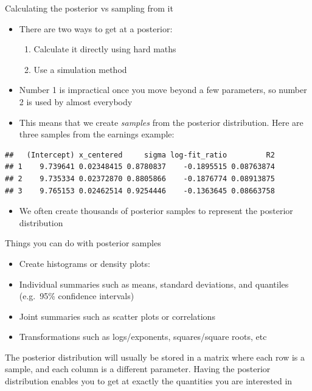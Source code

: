 \documentclass[ignorenonframetext,]{beamer}
\providecommand{\tightlist}{%
  \setlength{\itemsep}{0pt}\setlength{\parskip}{0pt}}
\begin{document}
\begin{frame}[fragile]{Calculating the posterior vs sampling from it}

\begin{itemize}
\item
  There are two ways to get at a posterior:

  \begin{enumerate}
  \def\labelenumi{\arabic{enumi}.}
  \tightlist
  \item
    Calculate it directly using hard maths
  \item
    Use a simulation method
  \end{enumerate}
\item
  Number 1 is impractical once you move beyond a few parameters, so
  number 2 is used by almost everybody
\item
  This means that we create \emph{samples} from the posterior
  distribution. Here are three samples from the earnings example:
\end{itemize}

\tiny

\begin{verbatim}
##   (Intercept) x_centered     sigma log-fit_ratio         R2
## 1    9.739641 0.02348415 0.8780837    -0.1895515 0.08763874
## 2    9.735334 0.02372870 0.8805866    -0.1876774 0.08913875
## 3    9.765153 0.02462514 0.9254446    -0.1363645 0.08663758
\end{verbatim}

\normalsize

\begin{itemize}
\tightlist
\item
  We often create thousands of posterior samples to represent the
  posterior distribution
\end{itemize}

\end{frame}

\begin{frame}{Things you can do with posterior samples}

\begin{itemize}
\tightlist
\item
  Create histograms or density plots:
\item
  Individual summaries such as means, standard deviations, and quantiles
  (e.g.~95\% confidence intervals)
\item
  Joint summaries such as scatter plots or correlations
\item
  Transformations such as logs/exponents, squares/square roots, etc
\end{itemize}

The posterior distribution will usually be stored in a matrix where each
row is a sample, and each column is a different parameter. Having the
posterior distribution enables you to get at exactly the quantities you
are interested in

\end{frame}
\end{document}
